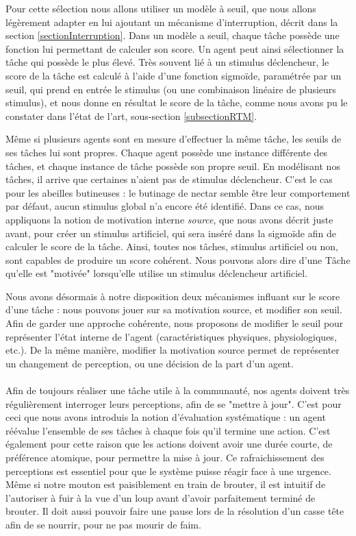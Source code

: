 			Pour cette sélection nous allons utiliser un modèle à seuil, que nous allons légèrement adapter en lui ajoutant un mécanisme d'interruption, décrit dans la section \ref{sectionInterruption}. Dans un modèle a seuil, chaque tâche possède une fonction lui permettant de calculer son score. Un agent peut ainsi sélectionner la tâche qui possède le plus élevé. Très souvent lié à un stimulus déclencheur, le score de la tâche est calculé à l'aide d'une fonction sigmoïde, paramétrée par un seuil, qui prend en entrée le stimulus (ou une combinaison linéaire de plusieurs stimulus), et nous donne en résultat le score de la tâche, comme nous avons pu le constater dans l'état de l'art, sous-section \ref{subsectionRTM}.
			
			Même si plusieurs agents sont en mesure d'effectuer la même tâche, les seuils de ses tâches lui sont propres. Chaque agent possède une instance différente des tâches, et chaque instance de tâche possède son propre seuil. En modélisant nos tâches, il arrive que certaines n'aient pas de stimulus déclencheur. C'est le cas pour les abeilles butineuses : le butinage de nectar semble être leur comportement par défaut, aucun stimulus global n'a encore été identifié. Dans ce cas, nous appliquons la notion de motivation interne \textit{source}, que nous avons décrit juste avant, pour créer un stimulus artificiel, qui sera inséré dans la sigmoïde afin de calculer le score de la tâche. Ainsi, toutes nos tâches, stimulus artificiel ou non, sont capables de produire un score cohérent. Nous pouvons alors dire d'une Tâche qu'elle est "motivée" lorsqu'elle utilise un stimulus déclencheur artificiel.
			
			Nous avons désormais à notre disposition deux mécanismes influant sur le score d'une tâche : nous pouvons jouer sur sa motivation source, et modifier son seuil. Afin de garder une approche cohérente, nous proposons de modifier le seuil pour représenter l'état interne de l'agent (caractéristiques physiques, physiologiques, etc.). De la même manière, modifier la motivation source permet de représenter un changement de perception, ou une décision de la part d'un agent.
			
			\paragraph{}
			Afin de toujours réaliser une tâche utile à la communauté, nos agents doivent très régulièrement interroger leurs perceptions, afin de se "mettre à jour". C'est pour ceci que nous avons introduis la notion d'évaluation systématique : un agent réévalue l'ensemble de ses tâches à chaque fois qu'il termine une action. C'est également pour cette raison que les actions doivent avoir une durée courte, de préférence atomique, pour permettre la mise à jour. Ce rafraichissement des perceptions est essentiel pour que le système puisse réagir face à une urgence. Même si notre mouton est paisiblement en train de brouter, il est intuitif de l'autoriser à fuir à la vue d'un loup avant d'avoir parfaitement terminé de brouter. Il doit aussi pouvoir faire une pause lors de la résolution d'un casse tête afin de se nourrir, pour ne pas mourir de faim.
		

